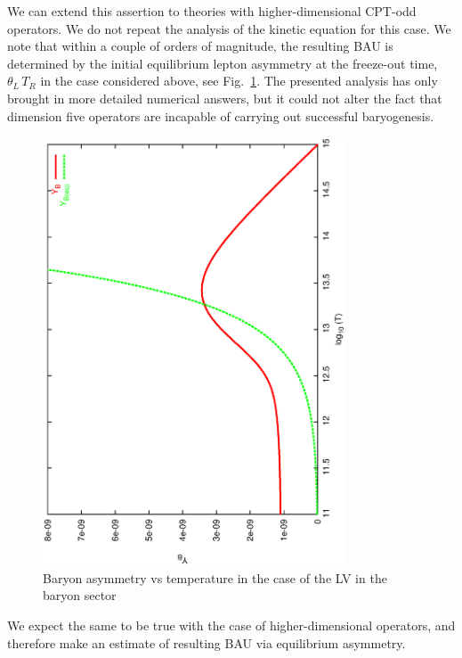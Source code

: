 \documentclass[12pt]{revtex4}
\begin{document}
	We can extend this assertion to theories with higher-dimensional 
	CPT-odd operators. 
	We do not repeat the analysis of the kinetic equation 
	for this case.
	We note that within a couple of orders of magnitude, the resulting BAU
	is determined by the initial equilibrium lepton asymmetry
	at the freeze-out time, $ \theta_L\,T_R $ in the case considered
	above, see Fig.~\ref{b_dom_asymm_bau}.
	The presented analysis has only brought in more 
	detailed numerical answers, but it could not alter the fact that
	dimension five operators are incapable of carrying out successful
	baryogenesis.
\begin{figure}
\includegraphics[width=9cm,angle=270]{b_dom_asymm_bau.ps}
\caption{Baryon asymmetry vs temperature in the case of the LV in the baryon sector}
\label{b_dom_asymm_bau}
\end{figure}
	We expect the same to be true with the case of higher-dimensional
	operators, and therefore make an estimate of resulting BAU 
	via equilibrium asymmetry.
\end{document}
